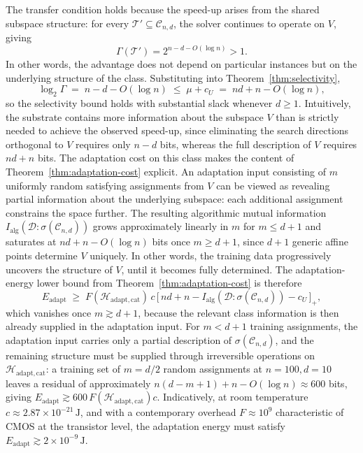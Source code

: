 \documentclass[runningheads]{llncs}
\newcommand{\Erasure}{c}
\newcommand{\Fover}{F}
\newcommand{\Hw}{\mathcal{H}}
\newcommand{\Task}{\mathcal{T}}
\newcommand{\Class}{\mathcal{C}}
\newcommand{\Eadapt}{E_{\mathrm{adapt}}}
\newcommand{\MutInfo}{I_{\mathrm{alg}}}
\begin{document}
The transfer condition holds because the speed-up arises from the
shared subspace structure: for every
$\Task'\subseteq\Class_{n,d}$, the solver continues to operate on
$V$, giving
\[
\Gamma(\Task')=2^{n-d-O(\log n)}>1.
\]
In other words, the advantage does not depend on particular
instances but on the underlying structure of the class. Substituting into Theorem~\ref{thm:selectivity},
\begin{equation}
\log_2\Gamma\;=\;n-d-O(\log n)\;\le\;\mu+c_U\;=\;n d+n-O(\log n),
\end{equation}
so the selectivity bound holds with substantial slack whenever
$d\ge 1$. Intuitively, the substrate contains more information about
the subspace $V$ than is strictly needed to achieve the observed
speed-up, since eliminating the search directions orthogonal to $V$
requires only $n-d$ bits, whereas the full description of $V$
requires $n d + n$ bits.
The adaptation cost on this class makes the content of
Theorem~\ref{thm:adaptation-cost} explicit. An adaptation input
consisting of $m$ uniformly random satisfying assignments from $V$
can be viewed as revealing partial information about the underlying
subspace: each additional assignment constrains the space further. The resulting algorithmic mutual information
$\MutInfo(\mathcal{D}:\sigma(\Class_{n,d}))$ grows approximately
linearly in $m$ for $m\le d+1$ and saturates at $nd+n-O(\log n)$ bits
once $m\ge d+1$, since $d+1$ generic affine points determine $V$
uniquely. In other words, the training data progressively uncovers
the structure of $V$, until it becomes fully determined. The adaptation-energy lower bound from
Theorem~\ref{thm:adaptation-cost} is therefore
\begin{equation}
\label{eq:affine-adapt}
\Eadapt\;\ge\;
\Fover(\Hw_{\mathrm{adapt,cat}})\,\Erasure\,
\bigl[\,n d+n-\MutInfo(\mathcal{D}:\sigma(\Class_{n,d}))
-c_U\,\bigr]_+,
\end{equation}
which vanishes once \(m\gtrsim d+1\), because the relevant class information is then already supplied in the adaptation input. For $m<d+1$ training
assignments, the adaptation input carries only a partial description
of $\sigma(\Class_{n,d})$, and the remaining structure must be
supplied through irreversible operations on
$\Hw_{\mathrm{adapt,cat}}$: a training set of $m=d/2$ random
assignments at $n=100,d=10$ leaves a residual of approximately
$n(d-m+1)+n-O(\log n)\approx 600$ bits, giving
$\Eadapt\gtrsim 600\,\Fover(\Hw_{\mathrm{adapt,cat}})\Erasure$. Indicatively, at
room temperature $\Erasure\approx 2.87\times 10^{-21}\,\mathrm{J}$,
and with a contemporary overhead $\Fover\approx 10^{9}$ characteristic
of CMOS at the transistor level, the adaptation energy must satisfy
$\Eadapt\gtrsim 2\times 10^{-9}\,\mathrm{J}$.
\end{document}
